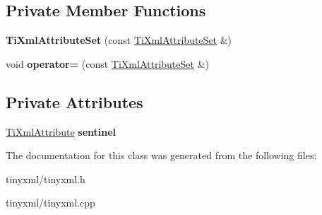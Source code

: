 \subsection*{\-Private \-Member \-Functions}
\begin{DoxyCompactItemize}
\item 
\hypertarget{class_ti_xml_attribute_set_acb244bc616c28b1c4b8e8417f28e5f9e}{{\bfseries \-Ti\-Xml\-Attribute\-Set} (const \hyperlink{class_ti_xml_attribute_set}{\-Ti\-Xml\-Attribute\-Set} \&)}\label{class_ti_xml_attribute_set_acb244bc616c28b1c4b8e8417f28e5f9e}

\item 
\hypertarget{class_ti_xml_attribute_set_a977f5b50c94e7b6beb01875298fa14a2}{void {\bfseries operator=} (const \hyperlink{class_ti_xml_attribute_set}{\-Ti\-Xml\-Attribute\-Set} \&)}\label{class_ti_xml_attribute_set_a977f5b50c94e7b6beb01875298fa14a2}

\end{DoxyCompactItemize}
\subsection*{\-Private \-Attributes}
\begin{DoxyCompactItemize}
\item 
\hypertarget{class_ti_xml_attribute_set_a1fda20434a148e7d09dd3ecc8e85db9c}{\hyperlink{class_ti_xml_attribute}{\-Ti\-Xml\-Attribute} {\bfseries sentinel}}\label{class_ti_xml_attribute_set_a1fda20434a148e7d09dd3ecc8e85db9c}

\end{DoxyCompactItemize}


\-The documentation for this class was generated from the following files\-:\begin{DoxyCompactItemize}
\item 
tinyxml/tinyxml.\-h\item 
tinyxml/tinyxml.\-cpp\end{DoxyCompactItemize}

